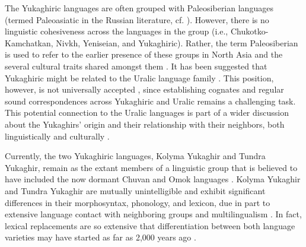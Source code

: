 \documentclass[output=paper,colorlinks,citecolor=brown
\ChapterDOI{10.5281/zenodo.15697581}
]{langscibook}
\begin{document}
The Yukaghiric languages are often grouped with Paleosiberian languages (termed Paleoasiatic in the Russian literature, cf. \citealp{Skorik1986, Volodin1997}). 
However, there is no linguistic cohesiveness across the languages in the group (i.e., Chukotko\hyp Kamchatkan, Nivkh, Yeniseian, and Yukaghiric). Rather, the term Paleosiberian is used to refer to the earlier presence of these groups in North Asia and the several  cultural traits shared amongst them \citep{Vajda2009}. 
It has been suggested that Yukaghiric might be related
to the Uralic language family \citep{Nikolaeva1988, Nikolaeva2006, Nikolaeva2020, Fortescue1998}.
This position, however, is not universally accepted \citep{Comrie1981, Abondolo1998, Aikio2014}, since establishing cognates and regular sound correspondences across Yukaghiric and Uralic remains a challenging task. 
This potential connection to the Uralic languages is part of a wider discussion about the Yukaghirs' origin and their relationship with their neighbors, both linguistically and culturally \citep{Grebenjuk&Fedorcenko2018, Gogolev-etal2022}.

Currently, the two Yukaghiric languages, Kolyma Yukaghir and Tundra Yukaghir, remain as the extant members of a linguistic group that is believed to have included the now dormant Chuvan and Omok languages \citep{Nikolaeva2008}.
Kolyma Yukaghir and Tundra Yukaghir are mutually unintelligible and exhibit significant differences in their morphosyntax, phonology, and lexicon, due in part to extensive language contact with neighboring groups and multilingualism \citep[27--28]{Maslova2003}.
In fact, lexical replacements are so extensive that differentiation between both language varieties may have started as far as 2,000 years ago \citep{Nikolaeva&Xelimskij1997}. 

 
\end{document}
